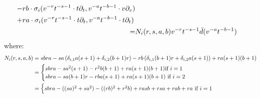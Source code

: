 \begin{example}
\begin{itemize}
$$\begin{aligned}
\begin{aligned}
                                - & r b \cdot \sigma_i( v^{-r} t^{-s - 1} \cdot t \del_t, v^{-a} t^{-b - 1} \cdot v\del_v )
                                \\
                                + & r a \cdot \sigma_i( v^{-r} t^{-s - 1} \cdot t \del_t, v^{-a} t^{-b - 1} \cdot t \del_t )
                            \end{aligned}
                            \\
                            = & N_i(r, s, a, b) v^{-r} t^{-s - 1} \bar{d}( v^{-a} t^{-b - 1} )
                        \end{aligned}
                    $$
                where:
                    $$
                        \begin{aligned}
                            N_i(r, s, a, b) & = 
                            sbra
                            - sa \left( \delta_{i, 1} a(s + 1) + \delta_{i, 2} (b + 1) r \right) 
                            - rb \left( \delta_{i, 1} (b + 1) r + \delta_{i, 2} a (s + 1) \right)
                            + r a (s + 1) (b + 1)
                            \\
                            & = 
                            \begin{cases}
                                \text{$
                                    sbra
                                    - s a^2 (s + 1) 
                                    - r^2 b (b + 1)
                                    + r a (s + 1) (b + 1)
                                $if $i = 1$}
                                \\
                                \text{$
                                    sbra
                                    - sa (b + 1) r
                                    - rb a (s + 1)
                                    + r a (s + 1) (b + 1)
                                $ if $i = 2$}
                            \end{cases}
                            \\
                            & = 
                            \begin{cases}
                                \text{$
                                    sbra
                                    - ( (sa)^2 + s a^2 ) 
                                    - ( (rb)^2 + r^2 b ) 
                                    + rasb + rsa + rab + ra
                                $ if $i = 1$}
                                \\

\end{cases}
\end{aligned}$$
\end{itemize}
\end{example}
